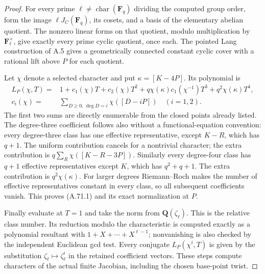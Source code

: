 \documentclass[11pt]{article}
\begin{document}
\begin{proof}
For every prime $\ell\ne\operatorname{char}(\mathbf F_q)$
dividing the computed group order, form the image
$\ell J_C(\mathbf F_q)$, its cosets, and a basis of the
elementary abelian quotient. The nonzero linear forms on
that quotient, modulo multiplication by
$\mathbf F_\ell^\times$, give exactly every prime cyclic
quotient, once each. The pointed Lang construction of A.5
gives a geometrically connected constant cyclic cover with
a rational lift above $P$ for each quotient.

Let $\chi$ denote a selected character and put
$\kappa=[K-4P]$. Its polynomial is
\[
 \begin{split}
 L_P(\chi,T)={}&1+c_1(\chi)T+c_2(\chi)T^2
       +q\chi(\kappa)c_1(\chi^{-1})T^3
       +q^2\chi(\kappa)T^4,\\
 c_i(\chi)={}&\sum_{D\ge0,\,\deg D=i}\chi([D-iP])
                                      \quad(i=1,2).
 \end{split}                                                   \tag{A.71.1}
\]
The first two sums are directly enumerable from the closed
points already listed. The degree-three coefficient follows
also without a functional-equation convention: every
degree-three class has one effective representative, except
$K-R$, which has $q+1$. The uniform contribution cancels
for a nontrivial character; the extra contribution is
$q\sum_R\chi([K-R-3P])$. Similarly every degree-four
class has $q+1$ effective representatives except $K$, which
has $q^2+q+1$. The extra contribution is
$q^2\chi(\kappa)$. For larger degrees Riemann--Roch makes
the number of effective representatives constant in every
class, so all subsequent coefficients vanish. This proves
(A.71.1) and its exact normalization at $P$.

Finally evaluate at $T=1$ and take the norm from
$\mathbf Q(\zeta_\ell)$. This is the relative class number.
Its reduction modulo the characteristic is computed exactly
as a polynomial resultant with
$1+X+\cdots+X^{\ell-1}$; nonvanishing is also checked by
the independent Euclidean gcd test. Every conjugate
$L_P(\chi^i,T)$ is given by the substitution
$\zeta_\ell\mapsto\zeta_\ell^i$ in the retained coefficient
vectors. These steps compute characters of the actual
finite Jacobian, including the chosen base-point twist.
\end{proof}
\end{document}
